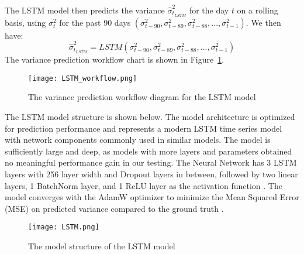 The LSTM model then predicts the variance $\hat{\sigma}_{t_{LSTM}}^2$ for the day $t$ on a rolling basis, using $\sigma_t^2$ for the past 90 days $(\sigma_{t-90}^2, \sigma_{t-89}^2, \sigma_{t-88}^2,...,\sigma_{t-1}^2)$. We then have: 
\begin{equation}
    \hat{\sigma}_{t_{LSTM}}^2 = LSTM (\sigma_{t-90}^2, \sigma_{t-89}^2, \sigma_{t-88}^2,...,\sigma_{t-1}^2)
\end{equation}
The variance prediction workflow chart is shown in Figure~\ref{LSTMWF}.

\begin{figure}[h]
  \centering
  \texttt{[image: LSTM\_workflow.png]}
  \caption{The variance prediction workflow diagram for the LSTM model}
  \label{LSTMWF}
\end{figure}

The LSTM model structure is shown below. The model architecture is optimized for prediction performance and represents a modern LSTM time series model with network components commonly used in similar models. The model is sufficiently large and deep, as models with more layers and parameters obtained no meaningful performance gain in our testing. The Neural Network has 3 LSTM layers with 256 layer width and Dropout layers in between, followed by two linear layers, 1 BatchNorm layer, and 1 ReLU layer as the activation function \cite{ioffe_batch_2015, agarap_deep_2018, srivastava_dropout_2014}. The model converges with the AdamW optimizer to minimize the Mean Squared Error (MSE) on predicted variance compared to the ground truth \cite{loshchilov_decoupled_2017}. 

\begin{figure}[h]
  \centering
  \texttt{[image: LSTM.png]}
  \caption{The model structure of the LSTM model}
\end{figure}

